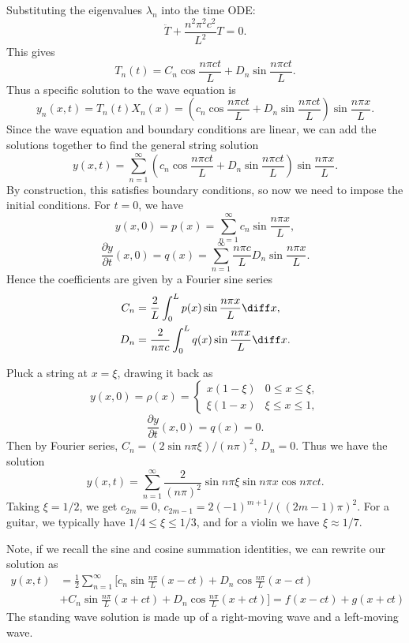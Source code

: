 \documentclass[12pt]{article}
\begin{document}
Substituting the eigenvalues $\lambda_n$ into the time ODE:
\[
\ddot T + \frac{n^2 \pi^2 c^2}{L^2} T = 0
.\]
This gives
\[
	T_n(t) = C_n \cos \frac{n \pi ct}{L} + D_n \sin \frac{n \pi ct}{L}
.\]
Thus a specific solution to the wave equation is
\[
	y_n(x, t) = T_n(t)X_n(x) = \left(c_n \cos \frac{n \pi ct}{L} + D_n \sin \frac{n \pi ct}{L} \right) \sin \frac{n \pi x}{L}
.\]
Since the wave equation and boundary conditions are linear, we can add the solutions together to find the general string solution
\[
	y(x, t) = \sum_{n = 1}^{\infty} \left( c_n \cos \frac{n \pi ct}{L} + D_n \sin \frac{n \pi ct}{L} \right) \sin \frac{n \pi x}{L}
.\]
By construction, this satisfies boundary conditions, so now we need to impose the initial conditions. For $t = 0$, we have
\[
	y(x, 0) = p(x) = \sum_{n = 1}^{\infty} c_n \sin \frac{n \pi x}{L}
,\]
\[
	\frac{\partial y}{\partial t}(x, 0) = q(x) = \sum_{n = 1}^{\infty} \frac{n \pi c}{L} D_n \sin \frac{n \pi x}{L}
.\]
Hence the coefficients are given by a Fourier sine series
\begin{align*}
	C_n &= \frac{2}{L} \int_{0}^{L}p(x) \sin \frac{n \pi x}{L} \diff x, \\
	D_n &= \frac{2}{n \pi c} \int_{0}^{L}q(x) \sin \frac{n \pi x}{L} \diff x.
\end{align*}

\begin{exbox}
	Pluck a string at $x = \xi$, drawing it back as
	\[
		y(x, 0) = \rho(x) =
		\begin{cases}
			x(1 - \xi) & 0 \leq x \leq \xi, \\
			\xi(1 - x) & \xi \leq x \leq 1,
		\end{cases}
	\]
	\[
		\frac{\partial y}{\partial t} (x, 0) = q(x) = 0
	.\]
	Then by Fourier series, $C_n = (2 \sin n \pi \xi)/(n \pi)^2$, $D_n = 0$. Thus we have the solution
	\[
		y(x, t) = \sum_{n = 1}^{\infty} \frac{2}{(n \pi)^2} \sin n \pi \xi \sin n \pi x \cos n \pi c t
	.\]
	Taking $\xi = 1/2$, we get $c_{2m} = 0$, $c_{2m-1} = 2(-1)^{m+1}/((2m-1)\pi)^2$. For a guitar, we typically have $1/4 \leq \xi \leq 1/3$, and for a violin we have $\xi \approx 1/7$.
\end{exbox}

Note, if we recall the sine and cosine summation identities, we can rewrite our solution as
\begin{align*}
	y(x, t) &= \frac{1}{2} \sum_{n = 1}^{\infty}\biggl[ c_n \sin \frac{n \pi}{L} (x - ct) + D_n \cos \frac{n \pi}{L} (x - ct) \\
		&+ C_n \sin \frac{n \pi}{L} (x + ct) + D_n \cos \frac{n \pi}{L} (x + ct) \biggr] = f(x - ct) + g(x + ct)
\end{align*}
The standing wave solution is made up of a right-moving wave and a left-moving wave.
\end{document}
